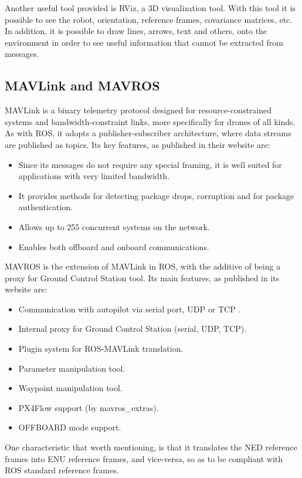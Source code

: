 Another useful tool provided is \ac{RViz}, a 3D visualization tool. With this tool it is possible to see the robot, orientation, reference frames, covariance matrices, etc. In addition, it is possible to draw lines, arrows, text and others, onto the environment in order to see useful information that cannot be extracted from messages.

\subsection{MAVLink and MAVROS}
\label{sssec:chapter2:drone:mavlink}
MAVLink is a binary telemetry protocol designed for resource-constrained systems and bandwidth-constraint links, more specifically for drones of all kinds. As with \ac{ROS}, it adopts a publisher-subscriber architecture, where data streams are published as topics. Its key features, as published in their website are:
\begin{itemize}
    \item Since its messages do not require any special framing, it is well suited for applications with very limited bandwidth.
    \item It provides methods for detecting package drops, corruption and for package authentication.
    \item Allows up to 255 concurrent systems on the network.
    \item Enables both offboard and onboard communications.
\end{itemize}
MAVROS is the extension of MAVLink in \ac{ROS}, with the additive of being a proxy for Ground Control Station tool. Its main features, as published in its website are:
\begin{itemize}
    \item Communication with autopilot via serial port, UDP or TCP .
    \item Internal proxy for Ground Control Station (serial, UDP, TCP).
    \item Plugin system for ROS-MAVLink translation.
    \item Parameter manipulation tool.
    \item Waypoint manipulation tool.
    \item PX4Flow support (by mavros\_extras).
    \item OFFBOARD mode support.
\end{itemize}

One characteristic that worth mentioning, is that it translates the \ac{NED} reference frames into \ac{ENU} reference frames, and vice-versa, so as to be compliant with \ac{ROS} standard reference frames.

